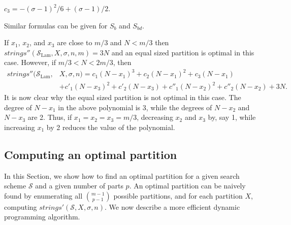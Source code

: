 \documentclass[12pt]{article}
\newcommand{\scheme}{\mathcal{S}}
\newcommand{\schemelam}{\mathcal{S}_{\text{Lam}}}
\newcommand{\partition}{X}
\newcommand{\numstrings}{\mathit{strings}}
\newcommand{\numstringsp}{\numstrings'}
\newcommand{\numstringspp}{\numstrings''}
\newcommand{\logn}{N}
\newif\ifextra
\begin{document}
$c_3 = -(\sigma-1)^2/6+(\sigma-1)/2$.
\ifextra
Similarly,
\[
\numstringspp(S_b,\sigma,n) = \begin{cases}
\logn & \text{if }\logn \leq x_3\\
c'_1(\logn-x_3)^2 + c'_2(\logn-x_3) + \logn
& \text{if }x_3 < \logn \leq x_2+x_3 \\
\begin{aligned}
&  c'_3(\logn-x_2-x_3)^3 + (c'_4+c'_5x_2)(\logn-x_2-x_3)^2\\
&+ (c'_6+c'_7x_2)(\logn-x_2-x_3) + \logn
\end{aligned}
& \text{otherwise}
\end{cases}
\]
where
$c'_1=(\sigma-1)^2/2$,
$c'_2=(\sigma-1)/2$,
$c'_3 = (\sigma-1)^2/6$,
$c'_4 = (\sigma-1)/2$,
$c'_5 = (\sigma-1)^2/2$,
$c'_6 = -(\sigma-1)^2/6+(\sigma-1)/2$, and
$c'_7 = (\sigma-1)^2/2+(\sigma-1)$.
\else
Similar formulas can be given for $S_b$ and $S_{bd}$.
\fi
If $x_1$, $x_2$, and $x_3$ are close to $m/3$ and $\logn < m/3$ then
$\numstringspp(\schemelam,\partition,\sigma,n,m) = 3\logn$ and an
equal sized partition is optimal in this case.
However, if $m/3 < \logn < 2m/3$, then
\begin{align*}
\numstringspp(\schemelam,&\partition,\sigma,n) =
   c_1(\logn-x_1)^3
 + c_2(\logn-x_1)^2
 + c_3(\logn-x_1)\\
& + c'_1(\logn-x_3)^2
 + c'_2(\logn-x_3)
 + c''_1(\logn-x_2)^2
 + c''_2(\logn-x_2)
 +3\logn.
\end{align*}
It is now clear why the equal sized partition is not optimal in this case.
The degree of $\logn-x_1$ in the above polynomial is 3, while
the degrees of $\logn-x_2$ and $\logn-x_3$ are 2.
Thus, if $x_1 = x_2 = x_3 = m/3$, decreasing $x_2$ and $x_3$ by, say 1,
while increasing $x_1$ by 2 reduces the value of the polynomial.
\fi

\subsection{Computing an optimal partition}
In this Section, we show how to find an optimal partition for a given
search scheme $\scheme$ and a given number of parts $p$.
An optimal partition can be naively found by enumerating
all $\binom{m-1}{p-1}$ possible partitions, and for each partition $\partition$, computing
$\numstringsp(\scheme,\partition,\sigma,n)$.
We now describe a more efficient dynamic programming algorithm.
\end{document}
